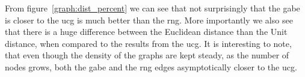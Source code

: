 From figure~\ref{graph:dist_percent} we can see that not surprisingly that the \ac{gabe} is closer to the \ac{ucg} is much better than the \ac{rng}. More importantly we also see that there is a huge difference between the Euclidean distance than the Unit distance, when compared to the results from the \ac{ucg}. It is interesting to note, that even though the density of the graphs are kept steady, as the number of nodes grows, both the \ac{gabe} and the \ac{rng} edges asymptotically closer to the \ac{ucg}. 


